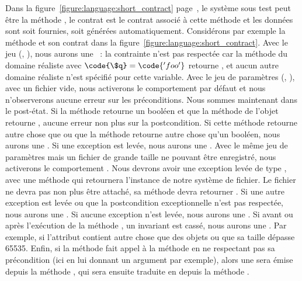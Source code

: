 \begin{example}

Dans la figure~\ref{figure:language:short_contract}
page~\pageref{figure:language:short_contract}, le système sous test peut être la
méthode , le contrat est le contrat associé à cette méthode et les
données sont soit fournies, soit générées automatiquement. Considérons par
exemple la méthode  et son contrat dans la
figure~\ref{figure:language:short_contract}.
%
Avec le jeu (, ), nous aurons une ~: la contrainte  n'est pas respectée car la
méthode  du domaine réaliste  avec $\code{\$q}
= \code{'foo'}$ retourne , et aucun autre domaine réaliste n'est
spécifié pour cette variable.
%
Avec le jeu de paramètres (, ), avec un fichier
vide, nous activerons le comportement par défaut et nous n'observerons aucune
erreur sur les préconditions. Nous sommes maintenant dans le post-état. Si la
méthode  retourne un booléen et que la méthode  de
l'objet  retourne , aucune erreur non plus sur la
postcondition.  Si cette méthode retourne autre chose que  ou que la
méthode  retourne autre chose qu'un booléen, nous aurons une
. Si une exception est levée, nous aurons une
.
%
Avec le même jeu de paramètres mais un fichier de grande taille ne pouvant être
enregistré, nous activerons le comportement . Nous devrons avoir une
exception levée de type , avec une méthode
 qui retournera l'instance de notre système de fichier. Le
fichier ne devra pas non plus être attaché, \ie sa méthode 
devra retourner . Si une autre exception est levée ou que la
postcondition exceptionnelle n'est pas respectée, nous aurons une
. Si aucune exception n'est levée, nous aurons une
.
%
Si avant ou après l'exécution de la méthode , un invariant est
cassé, nous aurons une . Par exemple, si l'attribut
 contient autre chose que des objets  ou que sa taille
dépasse 65535.
%
Enfin, si la méthode  fait appel à la méthode  en ne
respectant pas sa précondition (ici en lui donnant un argument par exemple),
alors une  sera émise depuis la méthode
, qui sera ensuite traduite en  depuis la méthode .

\end{example}

